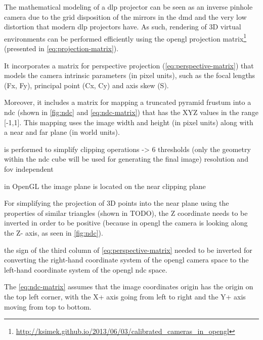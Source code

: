 The mathematical modeling of a \gls{dlp} projector can be seen as an inverse pinhole camera due to the grid disposition of the mirrors in the \gls{dmd} and the very low distortion that modern \gls{dlp} projectors have. As such, rendering of 3D virtual environments can be performed efficiently using the \gls{opengl} projection matrix\footnote{\url{http://ksimek.github.io/2013/06/03/calibrated\_cameras\_in\_opengl}} (presented in \cref{eq:projection-matrix}).

It incorporates a matrix for perspective projection (\cref{eq:perspective-matrix}) that models the camera intrinsic parameters \cite{Hartley2003} (in pixel units), such as
the focal lengths (Fx, Fy), principal point (Cx, Cy) and axis skew (S).

Moreover, it includes a matrix for mapping a truncated pyramid frustum into a \gls{ndc} (shown in \cref{fig:ndc} and \cref{eq:ndc-matrix}) that has the XYZ values in the range [-1,1]. This mapping uses the image width and height (in pixel units) along with a near and far plane (in world units).

is performed to
simplify clipping operations -> 6 thresholds
(only the geometry within the \gls{ndc} cube will be used for generating the final image)
resolution and fov independent

in OpenGL the image plane is located on the near clipping plane 

For simplifying the projection of 3D points into the near plane using the properties of similar triangles (shown in TODO), the Z coordinate needs to be inverted in order to be positive (because in \gls{opengl} the camera is looking along the Z- axis, as seen in \cref{fig:ndc}).

the sign of the third column of \cref{eq:perspective-matrix} needed to be inverted for converting the right-hand coordinate system of the \gls{opengl} camera space to the left-hand coordinate system of the \gls{opengl} \gls{ndc} space.

The \cref{eq:ndc-matrix} assumes that the image coordinates origin has the origin on the top left corner, with the X+ axis going from left to right and the Y+ axis moving from top to bottom.


